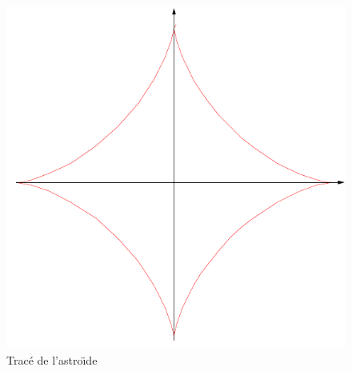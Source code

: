 \begin{figure}[ht]
  \centering
  \includegraphics{Castro_2.pdf}
  \caption{Trac{\'e} de l'astro{\"\i}de}
  \label{fig:Castro_2}
\end{figure}

